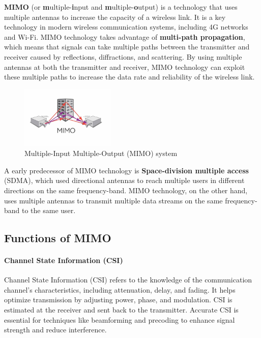 \textbf{MIMO} (or \textbf{m}ultiple-\textbf{i}nput and \textbf{m}ultiple-\textbf{o}utput) is a technology that uses multiple antennas to increase the capacity of a wireless link. 
It is a key technology in modern wireless communication systems, including 4G networks and Wi-Fi. 
MIMO technology takes advantage of \textbf{multi-path propagation}, which means that signals can take multiple paths between the transmitter and receiver caused by reflections, diffractions, and scattering. 
By using multiple antennas at both the transmitter and receiver, MIMO technology can exploit these multiple paths to increase the data rate and reliability of the wireless link.

\begin{figure}[H]
	\centering
	\includegraphics[width=0.4\textwidth]{Figures/mimo.png}
	\caption{Multiple-Input Multiple-Output (MIMO) system} 
\end{figure}

A early predecessor of MIMO technology is \textbf{Space-division multiple access} (SDMA), which used directional antennas to reach multiple users in different directions on the same frequency-band. MIMO technology, on the other hand, uses multiple antennas to transmit multiple data streams on the same frequency-band to the same user.


\subsection{Functions of MIMO}

\paragraph{Channel State Information (CSI)}
Channel State Information (CSI) refers to the knowledge of the communication channel’s characteristics, including attenuation, delay, and fading. 
It helps optimize transmission by adjusting power, phase, and modulation. 
CSI is estimated at the receiver and sent back to the transmitter. 
Accurate CSI is essential for techniques like beamforming and precoding to enhance signal strength and reduce interference.


